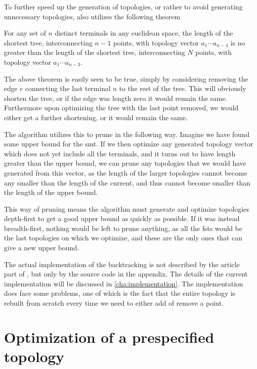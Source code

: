 To further speed up the generation of topologies, or rather to avoid generating
unnecessary topologies, \citeauthor{smith1992} also utilizes the following theorem
%
\begin{theorem}
  For any set of $n$ distinct terminals in any euclidean space, the length of
  the shortest tree, interconnecting $n-1$ points, with topology vector
  $a_1 \cdots a_{n-4}$ is no greater than the length of the shortest tree,
  interconnecting $N$ points, with topology vector $a_1 \cdots a_{n-3}$.
\end{theorem}
%
The above theorem is easily seen to be true, simply by considering removing the
edge $e$ connecting the last terminal $n$ to the rest of the tree. This will
obviously shorten the tree, or if the edge was length zero it would remain the
same. Furthermore upon optimizing the tree with the last point removed, we
would either get a further shortening, or it would remain the same.

The algorithm utilizes this to prune in the following way. Imagine we have
found some upper bound for the \ac{smt}. If we then optimize any generated
topology vector which does not yet include all the terminals, and it turns out
to have length greater than the upper bound, we can prune any topologies that we
would have generated from this vector, as the length of the larger topologies
cannot become any smaller than the length of the current, and thus cannot become
smaller than the length of the upper bound.

This way of pruning means the algorithm must generate and optimize topologies
depth-first to get a good upper bound as quickly as possible. If it was instead
breadth-first, nothing would  be left to prune anything, as all the \acp{fst}
would be the last topologies on which we optimize, and these are the only ones
that can give a new upper bound.

The actual implementation of the backtracking is not described by the article
part of \textcite{smith1992}, but only by the source code in the appendix. The
details of the current implementation will be discussed in
\cref{cha:implementation}. The implementation does face some problems, one of
which is the fact that the entire topology is rebuilt from scratch every time we
need to either add of remove a point.

\section{Optimization of a prespecified topology}
\label{sec:optim-presp-topol}

